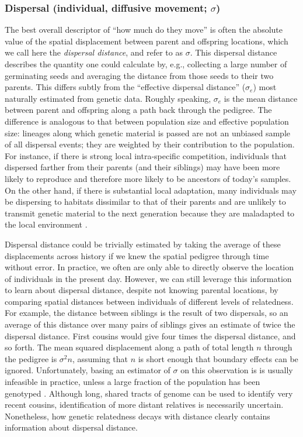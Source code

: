 \documentclass{ar-1col}
\begin{document}
\subsubsection{Dispersal (individual, diffusive movement; $\sigma$)}

The best overall descriptor of ``how much do they move''
is often the absolute value of the spatial displacement between parent and offspring locations,
which we call here the \textit{dispersal distance}, 
and refer to as $\sigma$.
This dispersal distance describes the quantity one could calculate by,
e.g., collecting a large number of germinating seeds
and averaging the distance from those seeds to their two parents.
This differs subtly from the ``effective dispersal distance'' ($\sigma_e$) 
most naturally estimated from genetic data.
Roughly speaking, $\sigma_e$ is
the mean distance between parent and offspring along a path back through the pedigree.
The difference is analogous to that between population size and effective population size:
lineages along which genetic material is passed are not an unbiased sample of all dispersal events;
they are weighted by their contribution to the population.
For instance, if there is strong local intra-specific competition,
individuals that dispersed farther from their parents (and their siblings)
may have been more likely to reproduce and therefore more likely to be ancestors of today's samples.
On the other hand, if there is substantial local adaptation,
many individuals may be dispersing to habitats dissimilar to that of their parents
and are unlikely to transmit genetic material to the next generation
because they are maladapted to the local environment
\citep[for a review, see][]{wangbradburd2014}.

Dispersal distance could be trivially estimated by taking
the average of these displacements across history
if we knew the spatial pedigree through time without error.
In practice, we often are only able to directly observe
the location of individuals in the present day.
However, we can still leverage this information to learn about dispersal distance,
despite not knowing parental locations, 
by comparing spatial distances between individuals of different levels of relatedness.
For example,
the distance between siblings is the result of two dispersals,
so an average of this distance over many pairs of siblings 
gives an estimate of twice the dispersal distance.
First cousins would give four times the dispersal distance, and so forth.
The mean squared displacement along
a path of total length $n$ through the pedigree is $\sigma^2 n$,
assuming that $n$ is short enough that boundary effects can be ignored.
Unfortunately, basing an estimator of $\sigma$ on this observation
is is usually infeasible in practice,
unless a large fraction of the population has been genotyped
\citep[e.g.,][]{Aguillon2017deconstructing}.
Although long, shared tracts of genome can be used to identify very recent cousins,
identification of more distant relatives is necessarily uncertain.
Nonetheless, how genetic relatedness decays with distance
clearly contains information about dispersal distance.
\end{document}
